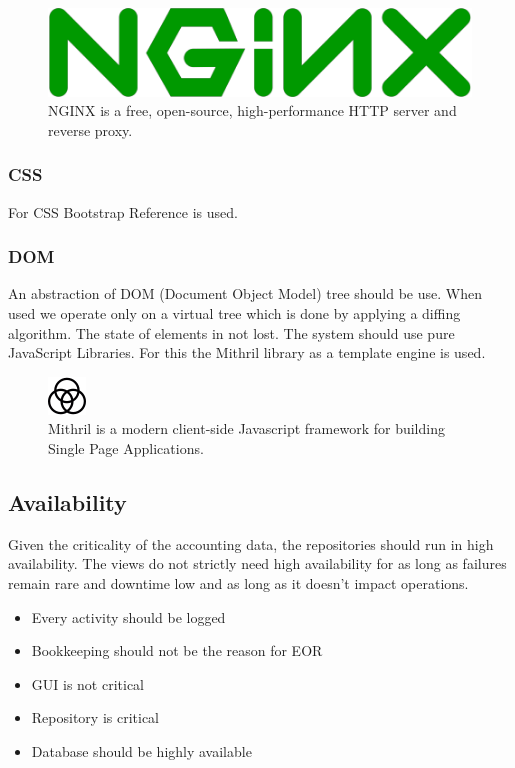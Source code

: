 \begin{figure}[h]
  \begin{center}
    \includegraphics[scale=0.3]{./images/nginx.png}
    \caption{NGINX is a free, open-source, high-performance HTTP server and reverse proxy.}
    \label{fig:}
  \end{center}
\end{figure}

\subsubsection{CSS}
For CSS Bootstrap Reference is used.

\subsubsection{DOM}
An abstraction of DOM (Document Object Model) tree should be use. When used we operate only on a virtual tree which is done by applying a diffing algorithm. The state of elements in not lost. The system should use pure JavaScript Libraries. For this the Mithril library as a template engine is used.

\begin{figure}[h]
  \begin{center}
    \includegraphics[scale=2]{./images/mithril.png}
    \caption{Mithril is a modern client-side Javascript framework for building Single Page Applications.}
    \label{fig:}
  \end{center}
\end{figure}

\subsection{Availability}
Given the criticality of the accounting data, the repositories should run in high availability. The views do not strictly need high availability for as long as failures remain rare and downtime low and as long as it doesn’t impact operations.

\begin{itemize}
  \item Every activity should be logged
  \item Bookkeeping should not be the reason for EOR
  \item GUI is not critical
  \item Repository is critical
  \item Database should be highly available
\end{itemize}

